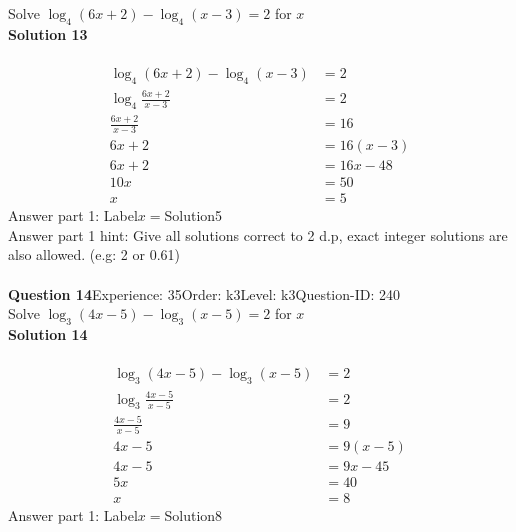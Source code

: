 \documentclass{article}
\begin{document}
Solve $\log_{4}(6x+2)-\log_{4}(x-3)=2$ for $x$\\[4pt]
\noindent\textbf{Solution 13}\\[2pt]
\\[-35pt]\begin{align*}
\log_{4}(6x+2)-\log_{4}(x-3)&=2\\[2pt]
\log_{4}\displaystyle\frac{6x+2}{x-3}&=2\\[2pt]
\displaystyle\frac{6x+2}{x-3}&=16\\[2pt]
6x+2&=16(x-3)\\[2pt]
6x+2&=16x-48\\[2pt]
10x&=50\\[2pt]
x&=5
\end{align*}
Answer part 1: \hspace{10pt}Label\hspace{10pt}$x=$\hspace{10pt}Solution\hspace{10pt}5\\
Answer part 1 hint: \hspace{15pt}Give all solutions correct to 2 d.p, exact integer solutions are also allowed. (e.g: 2 or 0.61)\\
\\[4pt]
\noindent\textbf{Question 14}\hspace{20pt}Experience: 35\hspace{20pt}Order: k3\hspace{20pt}Level: k3\hspace{20pt}Question-ID: 240\\[2pt]
Solve $\log_{3}(4x-5)-\log_{3}(x-5)=2$ for $x$\\[4pt]
\noindent\textbf{Solution 14}\\[2pt]
\\[-35pt]\begin{align*}
\log_{3}(4x-5)-\log_{3}(x-5)&=2\\[2pt]
\log_{3}\displaystyle\frac{4x-5}{x-5}&=2\\[2pt]
\displaystyle\frac{4x-5}{x-5}&=9\\[2pt]
4x-5&=9(x-5)\\[2pt]
4x-5&=9x-45\\[2pt]
5x&=40\\[2pt]
x&=8
\end{align*}
Answer part 1: \hspace{10pt}Label\hspace{10pt}$x=$\hspace{10pt}Solution\hspace{10pt}8\\
\end{document}
